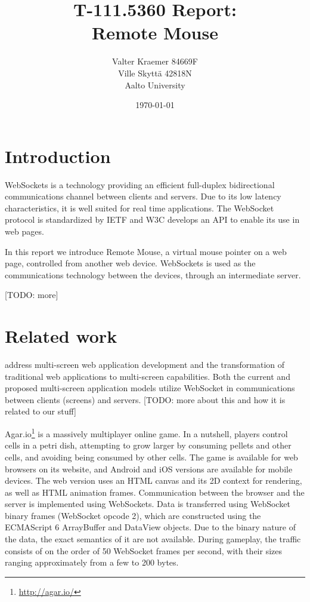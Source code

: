 \documentclass[12pt,a4paper,english,oneside]{article}
\begin{document}
\title{T-111.5360 Report:\\[5mm]
Remote Mouse}

\author{Valter Kraemer 84669F \\
  Ville Skyttä 42818N \\
Aalto University}

\date{\today}

\maketitle

\begin{multicols}{2}


\section{Introduction}

WebSockets is a technology providing an efficient full-duplex
bidirectional communications channel between clients and servers. Due
to its low latency characteristics, it is well suited for real time
applications. The WebSocket protocol is standardized by IETF
\citep{rfc} and W3C \citep{w3c} develops an API to enable its use in
web pages.

In this report we introduce Remote Mouse, a virtual mouse pointer on a
web page, controlled from another web device. WebSockets is used as
the communications technology between the devices, through an
intermediate server.

[TODO: more]

\section{Related work}

\citet{bassbouss} address multi-screen web application development and
the transformation of traditional web applications to multi-screen
capabilities. Both the current and proposed multi-screen application
models utilize WebSocket in communications between clients (screens)
and servers. [TODO: more about this and how it is related to our stuff]

Agar.io\footnote{\url{http://agar.io/}} is a massively multiplayer
online game. In a nutshell, players control cells in a petri dish,
attempting to grow larger by consuming pellets and other cells, and
avoiding being consumed by other cells. The game is available for web
browsers on its website, and Android and iOS versions are available
for mobile devices. The web version uses an HTML canvas and its 2D
context for rendering, as well as HTML animation frames. Communication
between the browser and the server is implemented using
WebSockets. Data is transferred using WebSocket binary frames
(WebSocket opcode 2), which are constructed using the ECMAScript 6
ArrayBuffer and DataView objects. Due to the binary nature of the
data, the exact semantics of it are not available. During gameplay,
the traffic consists of on the order of 50 WebSocket frames per
second, with their sizes ranging approximately from a few to 200
bytes.


\end{multicols}
\end{document}

